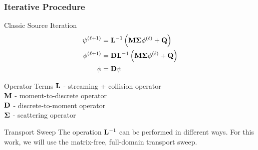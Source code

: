 \documentclass[compress,10pt]{beamer}
\begin{document}
\typeout{***********************************************************************************}
\begin{frame}[t]\frametitle{Iterative Procedure}
\begin{block}{Classic Source Iteration} {\small
\begin{equation*}
\begin{aligned}
 \psi^{(\ell+1)} &= {\bf L}^{-1} \left( {\bf M} {\bf \Sigma} \phi^{(\ell)}  +  {\bf Q} \right) \\
\phi^{(\ell+1)} &= {\bf D} {\bf L}^{-1} \left( {\bf M} {\bf \Sigma} \phi^{(\ell)}  +  {\bf Q} \right) \\
 \phi &= {\bf D} \psi
\end{aligned}
\end{equation*}
}\end{block}
\begin{block}{Operator Terms} {\small
${\bf L}$ - streaming + collision operator \\
${\bf M}$ - moment-to-discrete operator \\
${\bf D}$ - discrete-to-moment operator \\
${\bf \Sigma}$ - scattering operator 
}\end{block}
\begin{block}{Transport Sweep} {\small
The operation ${\bf L}^{-1}$ can be performed in different ways. For this work, we will use the matrix-free, full-domain transport sweep.
} \end{block}
\end{frame}
\typeout{***********************************************************************************}
\end{document}

